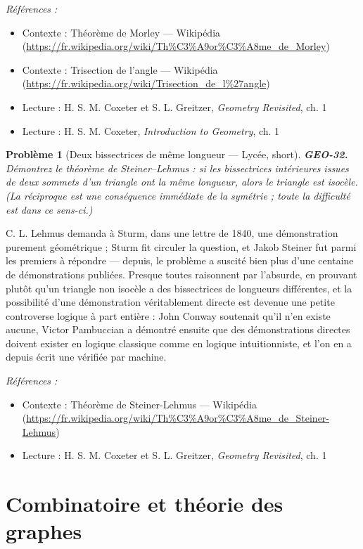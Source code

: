 \documentclass[11pt]{article}
\newtheorem{problem}{Problème}
\newenvironment{refs}{\par\small\noindent\emph{Références :}\begin{itemize}\setlength\itemsep{0pt}}{\end{itemize}\normalsize}
\begin{document}
\begin{refs}
\item Contexte : Théorème de Morley --- Wikipédia (\url{https://fr.wikipedia.org/wiki/Th%C3%A9or%C3%A8me_de_Morley})
\item Contexte : Trisection de l'angle --- Wikipédia (\url{https://fr.wikipedia.org/wiki/Trisection_de_l%27angle})
\item Lecture : H. S. M. Coxeter et S. L. Greitzer, \textit{Geometry Revisited}, ch. 1
\item Lecture : H. S. M. Coxeter, \textit{Introduction to Geometry}, ch. 1
\end{refs}

\bigskip

\begin{problem}[{Deux bissectrices de même longueur --- Lycée, short}]
\textbf{GEO-32.} Démontrez le théorème de Steiner--Lehmus : si les bissectrices
intérieures issues de deux sommets d'un triangle ont la même longueur, alors le triangle est
isocèle. (La réciproque est une conséquence immédiate de la symétrie ; toute la difficulté est dans
ce sens-ci.)
\end{problem}

\noindent C. L. Lehmus demanda à Sturm, dans une lettre de 1840, une démonstration purement
géométrique ; Sturm fit circuler la question, et Jakob Steiner fut parmi les premiers à répondre ---
depuis, le problème a suscité bien plus d'une centaine de démonstrations publiées. Presque toutes
raisonnent par l'absurde, en prouvant plutôt qu'un triangle non isocèle a des bissectrices de
longueurs différentes, et la possibilité d'une démonstration véritablement \og{} directe \fg{} est devenue
une petite controverse logique à part entière : John Conway soutenait qu'il n'en existe aucune,
Victor Pambuccian a démontré ensuite que des démonstrations directes doivent exister en logique
classique comme en logique intuitionniste, et l'on en a depuis écrit une vérifiée par
machine.

\begin{refs}
\item Contexte : Théorème de Steiner-Lehmus --- Wikipédia (\url{https://fr.wikipedia.org/wiki/Th%C3%A9or%C3%A8me_de_Steiner-Lehmus})
\item Lecture : H. S. M. Coxeter et S. L. Greitzer, \textit{Geometry Revisited}, ch. 1
\end{refs}

\bigskip


\section*{Combinatoire et théorie des graphes}
\end{document}
